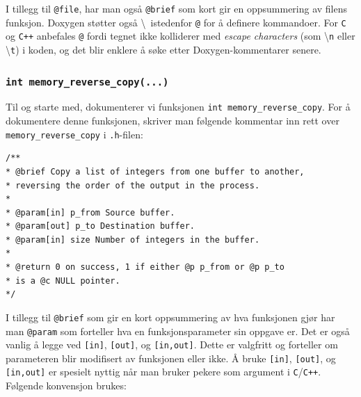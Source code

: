 \begin{alphasection}
I tillegg til \verb|@file|, har man også \verb|@brief| som kort gir en oppsummering av filens funksjon. Doxygen støtter også \textbackslash \ istedenfor \verb|@| for å definere kommandoer. For \verb|C| og \verb|C++| anbefales \verb|@| fordi tegnet ikke kolliderer med \emph{escape characters} (som \textbackslash \verb|n| eller \textbackslash \verb|t|) i koden, og det blir enklere å søke etter Doxygen-kommentarer senere.



\cprotect\subsubsection{\lstinline{int memory_reverse_copy(...)}}
Til og starte med, dokumenterer vi funksjonen \verb|int memory_reverse_copy|. For å dokumentere denne funksjonen, skriver man følgende kommentar inn rett
over \verb|memory_reverse_copy| i \verb|.h|-filen:

\begin{lstlisting}
/**
* @brief Copy a list of integers from one buffer to another,
* reversing the order of the output in the process.
*
* @param[in] p_from Source buffer.
* @param[out] p_to Destination buffer.
* @param[in] size Number of integers in the buffer.
*
* @return 0 on success, 1 if either @p p_from or @p p_to
* is a @c NULL pointer.
*/
\end{lstlisting}

I tillegg til \verb|@brief| som gir en kort oppsummering av hva funksjonen gjør har man \verb|@param| som forteller hva en funksjonsparameter sin oppgave er. Det er også vanlig å legge ved \verb|[in]|, \verb|[out]|, og \verb|[in,out]|. Dette er valgfritt og forteller om parameteren blir modifisert av funksjonen eller ikke. Å bruke \verb|[in]|, \verb|[out]|, og \verb|[in,out]| er spesielt nyttig når man bruker pekere som argument i \verb|C|/\verb|C++|. Følgende konvensjon brukes:


\end{alphasection}
